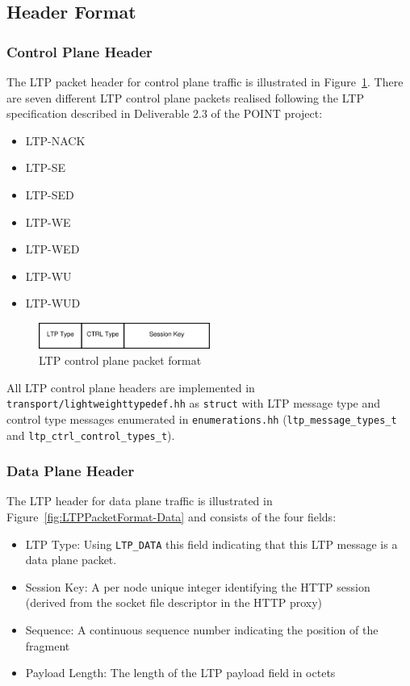 \documentclass[a4paper,11pt,titlepage]{report}
\begin{document}
\subsection{Header Format}
\subsubsection{Control Plane Header}
The \ac{LTP} packet header for control plane traffic is illustrated in Figure~\ref{fig:LTPPacketFormat-CTRL}. There are seven different \ac{LTP} control plane packets realised following the \ac{LTP} specification described in Deliverable 2.3 of the POINT project\cite{POINT}:

\begin{itemize}
	\item \ac{LTP}-\ac{NACK}
	\item \ac{LTP}-\ac{SE}
	\item \ac{LTP}-\ac{SED}
	\item \ac{LTP}-\ac{WE}
	\item \ac{LTP}-\ac{WED}
	\item \ac{LTP}-\ac{WU}
	\item \ac{LTP}-\ac{WUD}
\end{itemize}

\begin{figure}[ht]
	\begin{center}
		\includegraphics[width=0.5\textwidth]{eps/ltpPacketFormat-ctrl.eps}
		\caption{\acl{LTP} control plane packet format}
		\label{fig:LTPPacketFormat-CTRL}
	\end{center}
\end{figure}

All \ac{LTP} control plane headers are implemented in \texttt{transport/lightweighttypedef.hh} as \texttt{struct} with \ac{LTP} message type and control type messages enumerated in \texttt{enumerations.hh} (\texttt{ltp\_message\_types\_t} and \texttt{ltp\_ctrl\_control\_types\_t}).

\subsubsection{Data Plane Header}
The \ac{LTP} header for data plane traffic is illustrated in Figure~\ref{fig:LTPPacketFormat-Data} and consists of the four fields:

\begin{itemize}
	\item \ac{LTP} Type: Using \texttt{LTP\_DATA} this field indicating that this \ac{LTP} message is a data plane packet. 
	\item Session Key: A per node unique integer identifying the HTTP session (derived from the socket file descriptor in the HTTP proxy)
	\item Sequence: A continuous sequence number indicating the position of the fragment
	\item Payload Length: The length of the \ac{LTP} payload field in octets
\end{itemize}
\end{document}
